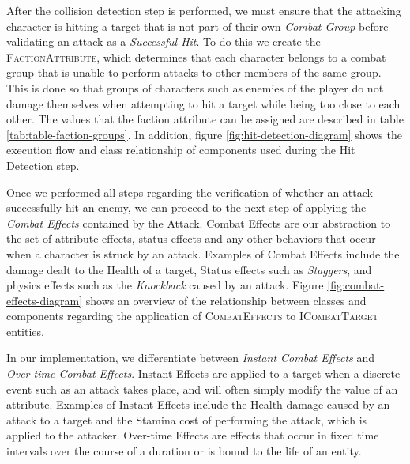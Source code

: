 After the collision detection step is performed, we must ensure that the attacking character is hitting a target that is not part of their own \emph{Combat Group} before validating an attack as a \emph{Successful Hit}. To do this we create the \textsc{FactionAttribute}, which determines that each character belongs to a combat group that is unable to perform attacks to other members of the same group. This is done so that groups of characters such as enemies of the player do not damage themselves when attempting to hit a target while being too close to each other. The values that the faction attribute can be assigned are described in table \ref{tab:table-faction-groups}. In addition, figure \ref{fig:hit-detection-diagram} shows the execution flow and class relationship of components used during the Hit Detection step.







Once we performed all steps regarding the verification of whether an attack successfully hit an enemy, we can proceed to the next step of applying the \emph{Combat Effects} contained by the Attack. Combat Effects are our abstraction to the set of attribute effects, status effects and any other behaviors that occur when a character is struck by an attack. Examples of Combat Effects include the damage dealt to the Health of a target, Status effects such as \emph{Staggers}, and physics effects such as the \emph{Knockback} caused by an attack. Figure \ref{fig:combat-effects-diagram} shows an overview of the relationship between classes and components regarding the application of \textsc{CombatEffects} to \textsc{ICombatTarget} entities.



In our implementation, we differentiate between \emph{Instant Combat Effects} and \emph{Over-time Combat Effects}. Instant Effects are applied to a target when a discrete event such as an attack takes place, and will often simply modify the value of an attribute. Examples of Instant Effects include the Health damage caused by an attack to a target and the Stamina cost of performing the attack, which is applied to the attacker. Over-time Effects are effects that occur in fixed time intervals over the course of a duration or is bound to the life of an entity.


